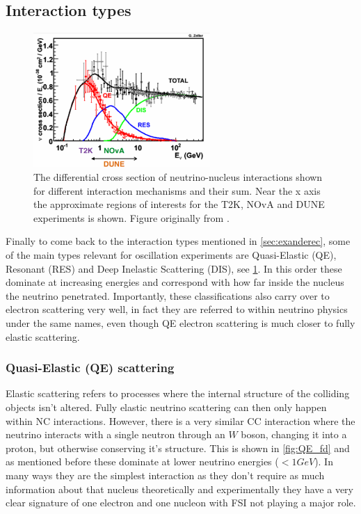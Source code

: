 \documentclass[a4paper,12pt]{article}
\begin{document}
\subsection{Interaction types}
\begin{figure}[H]
    \centering
    \includegraphics[width=0.6\textwidth]{figures/sigmaVsEnu.pdf}
    \caption{
        The differential cross section of neutrino-nucleus interactions shown for different interaction mechanisms and their sum.
        Near the x axis the approximate regions of interests for the T2K, NOvA and DUNE experiments is shown.
        Figure originally from \cite{formaggioEVEeVNeutrino2012}.
    }\label{fig:nusigma_vs_Enu}
\end{figure}

Finally to come back to the interaction types mentioned in \cref{sec:exanderec}, some of the main types relevant for oscillation experiments are Quasi-Elastic (QE), Resonant (RES) and Deep Inelastic Scattering (DIS), see \cref{fig:nusigma_vs_Enu}.
In this order these dominate at increasing energies and correspond with how far inside the nucleus the neutrino penetrated.
Importantly, these classifications also carry over to electron scattering very well, in fact they are referred to within neutrino physics under the same names, even though QE electron scattering is much closer to fully elastic scattering.

\subsubsection{Quasi-Elastic (QE) scattering}
Elastic scattering refers to processes where the internal structure of the colliding objects isn't altered.
Fully elastic neutrino scattering can then only happen within NC interactions.
However, there is a very similar CC interaction where the neutrino interacts with a single neutron through an $W$ boson, changing it into a proton, but otherwise conserving it's structure.
This is shown in \cref{fig:QE_fd} and as mentioned before these dominate at lower neutrino energies ($< 1\si{GeV}$).
In many ways they are the simplest interaction as they don't require as much information about that nucleus theoretically and experimentally they have a very clear signature of one electron and one nucleon with FSI not playing a major role.
\end{document}
